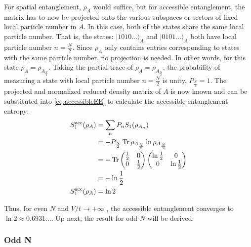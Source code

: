 %
For spatial entanglement, $\rho_{A}$ would suffice, but for accessible entanglement, the matrix has to now be projected onto the various subspaces or sectors of fixed local particle number in $A$. In this case, both of the states share the same local particle number. That is, the states: $|1010...\rangle_{A}$ and $|0101...\rangle_{A}$ both have local particle number $n = \frac{N}{2}$. Since $\rho_{A}$ only contains entries corresponding to states with the same particle number, no projection is needed. In other words, for this state $\rho_{A} = \rho_{A_{\frac{N}{2}}}$. Taking the partial trace of $\rho_{A} = \rho_{A_{\frac{N}{2}}}$, the probability of measuring a state with local particle number $n = \frac{N}{2} $ is unity, $P_{\frac{N}{2}}=1$. The projected and normalized reduced density matrix of $A$ is now known and can be substituted into \ref{eq:accessibleEE} to calculate the accessible entanglement entropy:
%
\begin{align} 
S_{1}^{\mathrm{acc}}(\rho_A) &= \sum_{n} P_n S_{1}(\rho_{A_n}) \nonumber \\
&= -P_{\frac{N}{2}}\operatorname{Tr}{\rho_{A_{\frac{N}{2}}} \ln{\rho_{A_{\frac{N}{2}}}}} \nonumber \\
&= -\operatorname{Tr}{\begin{pmatrix} \frac{1}{2} & 0 \\ 0 & \frac{1}{2}\end{pmatrix} \begin{pmatrix} \ln{\frac{1}{2}} & 0 \\ 0 & \ln{\frac{1}{2}} \end{pmatrix}} \\
&= -\ln{\frac{1}{2}} \\
S_{1}^{\mathrm{acc}}(\rho_A) &= \ln{2} 
\end{align}
%

Thus, for even $N$ and $V/t \to + \infty$ , the accessible entanglement converges to $\ln{2} \approx 0.6931\dots$. Up next, the result for odd $N$ will be derived.

	\subsubsection{Odd N}
	
